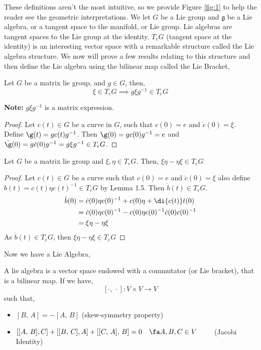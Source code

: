 \noindent
These definitions aren't the most intuitive, so we provide Figure \ref{fig:1} to help the reader see the geometric interpretations. We let $G$ be a Lie group and $\mathfrak{g}$ be a Lie algebra, or a tangent space to the manifold, or Lie group. Lie algebras are tangent spaces to the Lie group at the identity. $T_e G$ (tangent space at the identity) is an interesting vector space with a remarkable structure called the Lie algebra structure. We now will prove a few results relating to this structure and then define the Lie algebra using the bilinear map called the Lie Bracket,

\begin{nlemma}\label{lemma:comm}
  Let $G$ be a matrix lie group, and $g \in G$, then,
  $$ \xi \in T_eG \implies g\xi g^{-1} \in T_eG $$
\end{nlemma}
\noindent
\textbf{Note:} $g \xi g^{-1}$ is a matrix expression.\\

\begin{proof}
  Let $c(t) \in G$ be a curve in $G$, such that $c(0) = e$ and $\dot c (0) = \xi$. Define $\g (t) = gc(t)g^{-1}$. Then $\g(0) = g c(0) g^{-1} = e$ and $\dot\g (0) = g \dot c (0) g^{-1} = g\xi g^{-1} \in T_e G$.
\end{proof}

\begin{nprop}
  Let $G$ be a matrix lie group and $\xi, \eta \in T_eG$. Then, $\xi\eta - \eta\xi \in T_eG$
\end{nprop}
\begin{proof}
  Let $c(t) \in G$ be a curve such that $c(0) = e$ and $\dot c(0) = \xi$ also define $b(t) = c(t)\eta c(t)^{-1} \in T_eG$ by Lemma 1.5. Then $\dot b(t) \in T_eG$.
  \begin{align*}
    \dot b(0) &= \dot c(0)\eta c(0)^{-1} + c(0)\eta + \di {c(t)} t (0)\\
    &= \dot c(0)\eta c(0)^{-1} - c(0)\eta c(0)^{-1}\dot c(0) c(0)^{-1}\\
    &= \xi \eta - \eta\xi
  \end{align*}
  As $\dot b(t) \in T_eG$, then $\xi \eta - \eta\xi \in T_eG$
\end{proof}

\noindent
Now we have a Lie Algebra,
\begin{ndefi}
  A lie algebra is a vector space endowed with a {commutator }(or Lie bracket), that is a bilinear map. If we have,
  $$ [\cdot,\, \cdot] : V \times V \to V $$
  such that,
  \begin{itemize}
    \item $[B,\, A] = - [A,\, B]$ (skew-symmetry property)
    \item $[[A,\, B], C] + [[B,\, C], A] + [[C,\, A],\, B] = 0 \quad \fa A, B, C \in V \qquad$ (Jacobi Identity)
  \end{itemize}
\end{ndefi}

